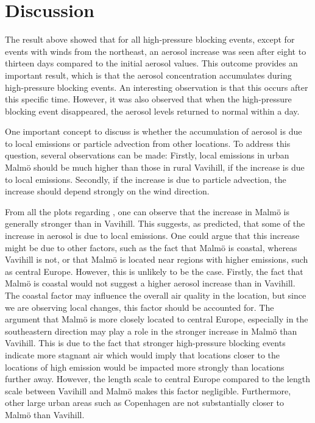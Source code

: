\newpage
\section{Discussion}
The result above showed that for all high-pressure blocking events, except for events with winds from the northeast, an aerosol increase was seen after eight to thirteen days compared to the initial aerosol values. This outcome provides an important result, which is that the aerosol concentration accumulates during high-pressure blocking events. An interesting observation is that this occurs after this specific time. However, it was also observed that when the high-pressure blocking event disappeared, the aerosol levels returned to normal within a day. 

One important concept to discuss is whether the accumulation of aerosol is due to local emissions or particle advection from other locations. To address this question, several observations can be made: Firstly, local emissions in urban Malmö should be much higher than those in rural Vavihill, if the increase is due to local emissions. Secondly, if the increase is due to particle advection, the increase should depend strongly on the wind direction. 

From all the plots regarding \PM, one can observe that the increase in Malmö is generally stronger than in Vavihill. This suggests, as predicted, that some of the increase in aerosol is due to local emissions. One could argue that this increase might be due to other factors, such as the fact that Malmö is coastal, whereas Vavihill is not, or that Malmö is located near regions with higher emissions, such as central Europe. However, this is unlikely to be the case. Firstly, the fact that Malmö is coastal would not suggest a higher aerosol increase than in Vavihill. The coastal factor may influence the overall air quality in the location, but since we are observing local changes, this factor should be accounted for. The argument that Malmö is more closely located to central Europe, especially in the southeastern direction may play a role in the stronger increase in Malmö than Vavihill. This is due to the fact that stronger high-pressure blocking events indicate more stagnant air which would imply that locations closer to the locations of high emission would be impacted more strongly than locations further away. However, the length scale to central Europe compared to the length scale between Vavihill and Malmö makes this factor negligible. Furthermore, other large urban areas such as Copenhagen are not substantially closer to Malmö than Vavihill. 


